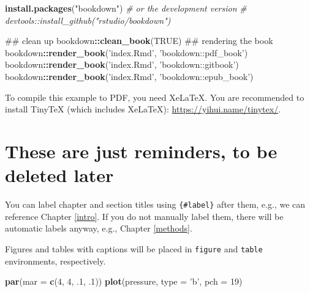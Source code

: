 \documentclass[12pt,]{book}
\newenvironment{Shaded}{\begin{snugshade}}{\end{snugshade}}
\newcommand{\CommentTok}[1]{\textcolor[rgb]{0.56,0.35,0.01}{\textit{#1}}}
\newcommand{\DataTypeTok}[1]{\textcolor[rgb]{0.13,0.29,0.53}{#1}}
\newcommand{\DecValTok}[1]{\textcolor[rgb]{0.00,0.00,0.81}{#1}}
\newcommand{\FloatTok}[1]{\textcolor[rgb]{0.00,0.00,0.81}{#1}}
\newcommand{\KeywordTok}[1]{\textcolor[rgb]{0.13,0.29,0.53}{\textbf{#1}}}
\newcommand{\NormalTok}[1]{#1}
\newcommand{\OperatorTok}[1]{\textcolor[rgb]{0.81,0.36,0.00}{\textbf{#1}}}
\newcommand{\OtherTok}[1]{\textcolor[rgb]{0.56,0.35,0.01}{#1}}
\newcommand{\StringTok}[1]{\textcolor[rgb]{0.31,0.60,0.02}{#1}}
\begin{document}
\begin{Shaded}
\begin{Highlighting}[]
\KeywordTok{install.packages}\NormalTok{(}\StringTok{"bookdown"}\NormalTok{)}
\CommentTok{# or the development version}
\CommentTok{# devtools::install_github("rstudio/bookdown")}

\NormalTok{## clean up }
\NormalTok{bookdown}\OperatorTok{::}\KeywordTok{clean_book}\NormalTok{(}\OtherTok{TRUE}\NormalTok{)}
\NormalTok{## rendering the book}
\NormalTok{bookdown}\OperatorTok{::}\KeywordTok{render_book}\NormalTok{(}\StringTok{'index.Rmd'}\NormalTok{, }\StringTok{'bookdown::pdf_book'}\NormalTok{)}
\NormalTok{bookdown}\OperatorTok{::}\KeywordTok{render_book}\NormalTok{(}\StringTok{'index.Rmd'}\NormalTok{, }\StringTok{'bookdown::gitbook'}\NormalTok{)}
\NormalTok{bookdown}\OperatorTok{::}\KeywordTok{render_book}\NormalTok{(}\StringTok{'index.Rmd'}\NormalTok{, }\StringTok{'bookdown::epub_book'}\NormalTok{)}
\end{Highlighting}
\end{Shaded}

To compile this example to PDF, you need XeLaTeX. You are recommended to install TinyTeX (which includes XeLaTeX): \url{https://yihui.name/tinytex/}.

\hypertarget{these-are-just-reminders-to-be-deleted-later}{%
\section{These are just reminders, to be deleted later}\label{these-are-just-reminders-to-be-deleted-later}}

You can label chapter and section titles using \texttt{\{\#label\}} after them, e.g., we can reference Chapter \ref{intro}. If you do not manually label them, there will be automatic labels anyway, e.g., Chapter \ref{methods}.

Figures and tables with captions will be placed in \texttt{figure} and \texttt{table} environments, respectively.

\begin{Shaded}
\begin{Highlighting}[]
\KeywordTok{par}\NormalTok{(}\DataTypeTok{mar =} \KeywordTok{c}\NormalTok{(}\DecValTok{4}\NormalTok{, }\DecValTok{4}\NormalTok{, }\FloatTok{.1}\NormalTok{, }\FloatTok{.1}\NormalTok{))}
\KeywordTok{plot}\NormalTok{(pressure, }\DataTypeTok{type =} \StringTok{'b'}\NormalTok{, }\DataTypeTok{pch =} \DecValTok{19}\NormalTok{)}
\end{Highlighting}
\end{Shaded}
\end{document}
